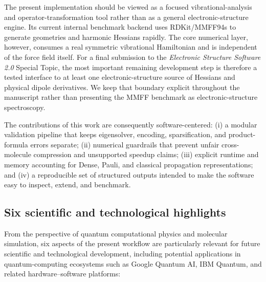 \documentclass[aip,jcp,reprint,amsmath,amssymb,floatfix]{revtex4-2}
\begin{document}
The present implementation should be viewed as a focused vibrational-analysis and operator-transformation tool rather than as a general electronic-structure engine. Its current internal benchmark backend uses RDKit/MMFF94s to generate geometries and harmonic Hessians rapidly. The core numerical layer, however, consumes a real symmetric vibrational Hamiltonian and is independent of the force field itself. For a final submission to the \emph{Electronic Structure Software 2.0} Special Topic, the most important remaining development step is therefore a tested interface to at least one electronic-structure source of Hessians and physical dipole derivatives. We keep that boundary explicit throughout the manuscript rather than presenting the MMFF benchmark as electronic-structure spectroscopy.

The contributions of this work are consequently software-centered: (i) a modular validation pipeline that keeps eigensolver, encoding, sparsification, and product-formula errors separate; (ii) numerical guardrails that prevent unfair cross-molecule compression and unsupported speedup claims; (iii) explicit runtime and memory accounting for Dense, Pauli, and classical propagation representations; and (iv) a reproducible set of structured outputs intended to make the software easy to inspect, extend, and benchmark.


\begingroup
\color{red}
\subsection*{Six scientific and technological highlights}

From the perspective of quantum computational physics and molecular simulation, six aspects of the present workflow are particularly relevant for future scientific and technological development, including potential applications in quantum-computing ecosystems such as Google Quantum AI, IBM Quantum, and related hardware--software platforms:
\end{document}
